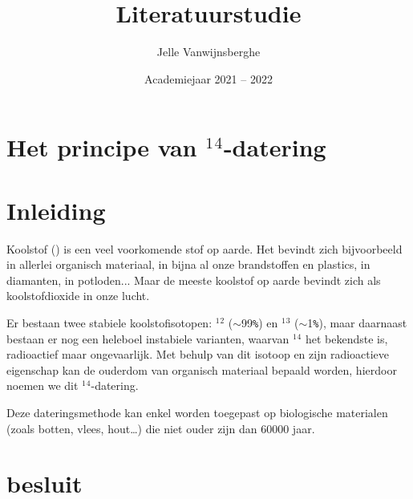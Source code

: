 \documentclass[kulak]{kulakarticle} %
\title{Literatuurstudie}
\author{Jelle Vanwijnsberghe}
\date{Academiejaar 2021 -- 2022}
\begin{document}
\maketitle

\section*{Het principe van $^1$$^4$-datering}

\section*{Inleiding}

Koolstof () is een veel voorkomende stof op aarde. Het bevindt zich bijvoorbeeld in allerlei organisch materiaal, in bijna al onze brandstoffen en plastics, in diamanten, in potloden... Maar de meeste koolstof op aarde bevindt zich als koolstofdioxide in onze lucht. 

Er bestaan twee stabiele koolstofisotopen: $^1$$^2$ ($\sim$\num{99}\verb|%|) en $^1$$^3$ ($\sim$\num{1}\verb|%|), maar daarnaast bestaan er nog een heleboel instabiele varianten, waarvan $^1$$^4$ het bekendste is, radioactief maar ongevaarlijk. Met behulp van dit isotoop en zijn radioactieve eigenschap kan de ouderdom van organisch materiaal bepaald worden, hierdoor noemen we dit $^1$$^4$-datering.

Deze dateringsmethode kan enkel worden toegepast op biologische materialen (zoals botten, vlees, hout…) die niet ouder zijn dan \num{60000} jaar. 

\section{besluit}
\end{document}
